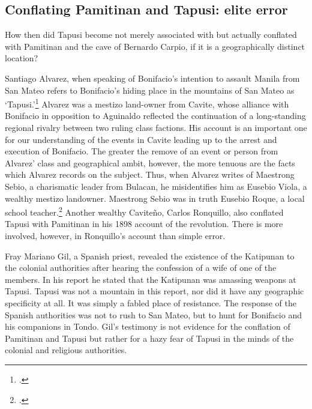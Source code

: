\subsection{Conflating Pamitinan and Tapusi: elite error}

How then did Tapusi become not merely associated with but actually conflated with Pamitinan and the cave of Bernardo Carpio, if it is a geographically distinct location?

Santiago Alvarez, when speaking of Bonifacio's intention to assault Manila from San Mateo refers to Bonifacio's hiding place in the mountains of San Mateo as \enquote*{Tapusi.}\footcite[156]{Alvarez1992} Alvarez was a mestizo land-owner from Cavite, whose alliance with Bonifacio in opposition to Aguinaldo reflected the continuation of a long-standing regional rivalry between two ruling class factions. His account is an important one for our understanding of the events in Cavite leading up to the arrest and execution of Bonifacio. The greater the remove of an event or person from Alvarez' class and geographical ambit, however, the more tenuous are the facts which Alvarez records on the subject. Thus, when Alvarez writes of Maestrong Sebio, a charismatic leader from Bulacan, he misidentifies him as Eusebio Viola, a wealthy mestizo landowner. Maestrong Sebio was in truth Eusebio Roque, a local school teacher.\footcite[98]{Alvarez1992} Another wealthy Cavite\~no, Carlos Ronquillo, also conflated Tapusi with Pamitinan in his 1898 account of the revolution. There is more involved, however, in Ronquillo's account than simple error.

Fray Mariano Gil, a Spanish priest, revealed the existence of the Katipunan to the colonial authorities after hearing the confession of a wife of one of the members. In his report he stated that the Katipunan was amassing weapons at Tapusi. Tapusi was not a mountain in this report, nor did it have any geographic specificity at all. It was simply a fabled place of resistance. The response of the Spanish authorities was not to rush to San Mateo, but to hunt for Bonifacio and his companions in Tondo. Gil's testimony is not evidence for the conflation of Pamitinan and Tapusi but rather for a hazy fear of Tapusi in the minds of the colonial and religious authorities.

